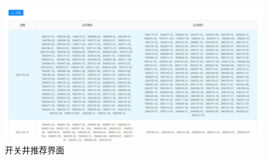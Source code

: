 \begin{figure}[H]
    \centering
    \includegraphics[width=.99\linewidth]{figure/开关井推荐-每日变化展示.pdf}
    \caption{开关井推荐界面}
    \label{fig:openre}
\end{figure}
